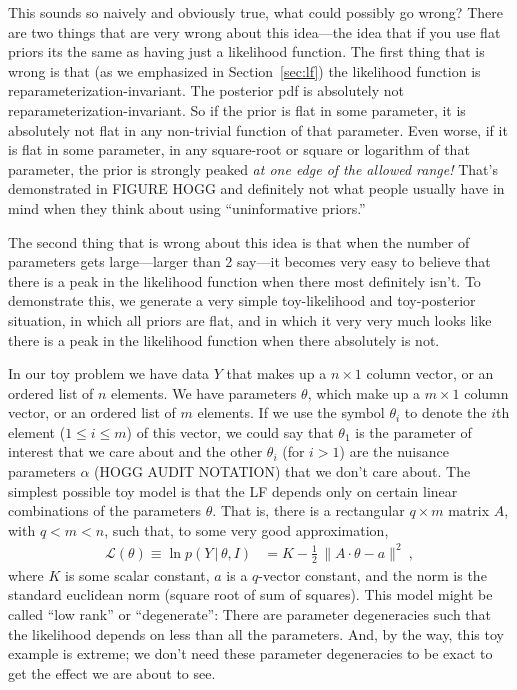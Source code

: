 \documentclass{article}
\newcommand{\sectionname}{Section}
\newcommand{\secref}[1]{\sectionname~\ref{#1}}
\newcommand{\given}{\,|\,}
\newcommand{\norm}[1]{\lVert{#1}\rVert}
\begin{document}
This sounds so naively and obviously true, what could possibly go wrong?
There are two things that are very wrong about this idea---the idea that if you use flat priors its the same as having just a likelihood function.
The first thing that is wrong is that (as we emphasized in \secref{sec:lf}) the likelihood function is reparameterization-invariant.
The posterior pdf is absolutely not reparameterization-invariant.
So if the prior is flat in some parameter, it is absolutely not flat in any non-trivial function of that parameter.
Even worse, if it is flat in some parameter, in any square-root or square or logarithm of that parameter, the prior is strongly peaked \emph{at one edge of the allowed range!}
That's demonstrated in FIGURE HOGG and definitely not what people usually have in mind when they think about using ``uninformative priors.''

The second thing that is wrong about this idea is that when the number of parameters gets large---larger than 2 say---it becomes very easy to believe that there is a peak in the likelihood function when there most definitely isn't.
To demonstrate this, we generate a very simple toy-likelihood and toy-posterior situation, in which all priors are flat, and in which it very very much looks like there is a peak in the likelihood function when there absolutely is not.

In our toy problem we have data $Y$ that makes up a $n\times 1$ column vector, or an ordered list of $n$ elements.
We have parameters $\theta$, which make up a $m\times 1$ column vector, or an ordered list of $m$ elements.
If we use the symbol $\theta_i$ to denote the $i$th element ($1\leq i\leq m$) of this vector, we could say that $\theta_1$ is the parameter of interest that we care about and the other $\theta_i$ (for $i>1$) are the nuisance parameters $\alpha$ (HOGG AUDIT NOTATION) that we don't care about.
The simplest possible toy model is that the LF depends only on certain linear combinations of the parameters $\theta$.
That is, there is a rectangular $q\times m$ matrix $A$, with $q<m<n$, such that, to some very good approximation,
\begin{align}
    \mathscr{L}(\theta) \equiv \ln p(Y\given\theta,I) &= K - \frac{1}{2}\,\norm{A\cdot\theta - a}^2 ~,\label{eq:toyLF}
\end{align}
where $K$ is some scalar constant, $a$ is a $q$-vector constant, and the norm is the standard euclidean norm (square root of sum of squares).
This model might be called ``low rank'' or ``degenerate'':
There are parameter degeneracies such that the likelihood depends on less than all the parameters.
And, by the way, this toy example is extreme; we don't need these parameter degeneracies to be exact to get the effect we are about to see.
\end{document}

